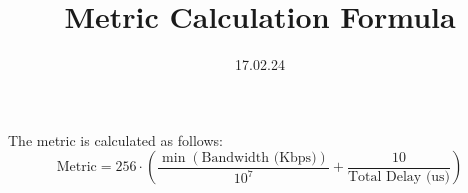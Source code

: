 \documentclass{article}
\begin{document}
\title{Metric Calculation Formula}
\author{}
\date{17.02.24}

\maketitle

The metric is calculated as follows:
\begin{equation}
\text{Metric} = 256 \cdot \left( \frac{\min(\text{Bandwidth (Kbps)})}{10^7} + \frac{10}{\text{Total Delay (us)}} \right)
\end{equation}
\end{document}
